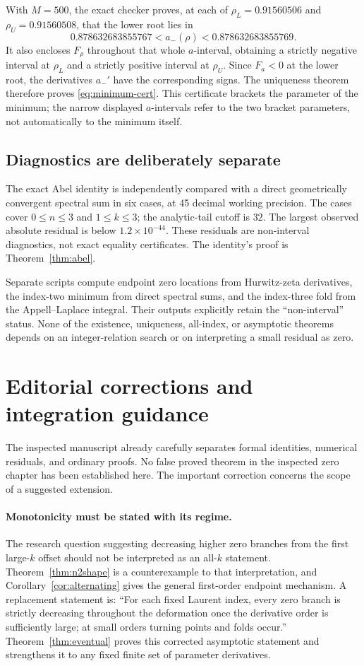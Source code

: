 \documentclass[11pt,letterpaper]{article}
\numberwithin{equation}{section}
\theoremstyle{definition}\newtheorem{definition}[theorem]{Definition}
\theoremstyle{remark}\newtheorem{remark}[theorem]{Remark}
\begin{document}
With $M=500$, the exact checker proves, at each of $\rho_L=0.91560506$ and $\rho_U=0.91560508$, that the lower root lies in
\[
 0.878632683855767<a_-(\rho)<0.878632683855769.
\]
It also encloses $F_\rho$ throughout that whole $a$-interval, obtaining a strictly negative interval at $\rho_L$ and a strictly positive interval at $\rho_U$. Since $F_a<0$ at the lower root, the derivatives $a_-'$ have the corresponding signs. The uniqueness theorem therefore proves \eqref{eq:minimum-cert}. This certificate brackets the parameter of the minimum; the narrow displayed $a$-intervals refer to the two bracket parameters, not automatically to the minimum itself.

\subsection{Diagnostics are deliberately separate}
The exact Abel identity is independently compared with a direct geometrically convergent spectral sum in six cases, at 45 decimal working precision. The cases cover $0\le n\le3$ and $1\le k\le3$; the analytic-tail cutoff is $32$. The largest observed absolute residual is below $1.2\times10^{-44}$. These residuals are non-interval diagnostics, not exact equality certificates. The identity's proof is Theorem~\ref{thm:abel}.

Separate scripts compute endpoint zero locations from Hurwitz-zeta derivatives, the index-two minimum from direct spectral sums, and the index-three fold from the Appell--Laplace integral. Their outputs explicitly retain the ``non-interval'' status. None of the existence, uniqueness, all-index, or asymptotic theorems depends on an integer-relation search or on interpreting a small residual as zero.

\section{Editorial corrections and integration guidance}\label{sec:editorial}
The inspected manuscript already carefully separates formal identities, numerical residuals, and ordinary proofs. No false proved theorem in the inspected zero chapter has been established here. The important correction concerns the scope of a suggested extension.

\paragraph{Monotonicity must be stated with its regime.}
The research question suggesting decreasing higher zero branches from the first large-$k$ offset should not be interpreted as an all-$k$ statement. Theorem~\ref{thm:n2shape} is a counterexample to that interpretation, and Corollary~\ref{cor:alternating} gives the general first-order endpoint mechanism. A replacement statement is: ``For each fixed Laurent index, every zero branch is strictly decreasing throughout the deformation once the derivative order is sufficiently large; at small orders turning points and folds occur.'' Theorem~\ref{thm:eventual} proves this corrected asymptotic statement and strengthens it to any fixed finite set of parameter derivatives.
\end{document}

